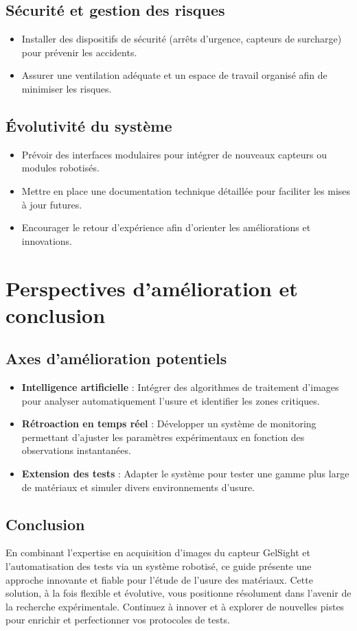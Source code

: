 \documentclass[a4paper,12pt]{article}
\begin{document}
\subsection{Sécurité et gestion des risques}
\begin{itemize}
    \item Installer des dispositifs de sécurité (arrêts d'urgence, capteurs de surcharge) pour prévenir les accidents.
    \item Assurer une ventilation adéquate et un espace de travail organisé afin de minimiser les risques.
\end{itemize}

\subsection{Évolutivité du système}
\begin{itemize}
    \item Prévoir des interfaces modulaires pour intégrer de nouveaux capteurs ou modules robotisés.
    \item Mettre en place une documentation technique détaillée pour faciliter les mises à jour futures.
    \item Encourager le retour d'expérience afin d'orienter les améliorations et innovations.
\end{itemize}

\section{Perspectives d'amélioration et conclusion}
\subsection{Axes d'amélioration potentiels}
\begin{itemize}
    \item \textbf{Intelligence artificielle} : Intégrer des algorithmes de traitement d'images pour analyser automatiquement l'usure et identifier les zones critiques.
    \item \textbf{Rétroaction en temps réel} : Développer un système de monitoring permettant d'ajuster les paramètres expérimentaux en fonction des observations instantanées.
    \item \textbf{Extension des tests} : Adapter le système pour tester une gamme plus large de matériaux et simuler divers environnements d'usure.
\end{itemize}

\subsection{Conclusion}
En combinant l'expertise en acquisition d'images du capteur GelSight et l'automatisation des tests via un système robotisé, ce guide présente une approche innovante et fiable pour l'étude de l'usure des matériaux. Cette solution, à la fois flexible et évolutive, vous positionne résolument dans l'avenir de la recherche expérimentale. Continuez à innover et à explorer de nouvelles pistes pour enrichir et perfectionner vos protocoles de tests.
\end{document}
